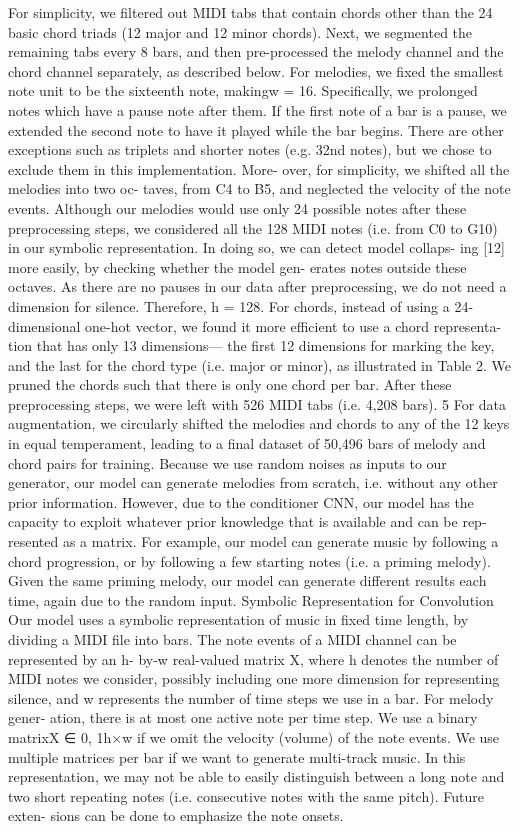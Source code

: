 For simplicity, we filtered out MIDI tabs that contain chords other than the 24 basic chord triads (12 major and 12 minor chords). Next, we segmented the remaining tabs every 8 bars, and then pre-processed the melody channel and the chord channel separately, as described below. For melodies, we fixed the smallest note unit to be the sixteenth note, makingw = 16. Specifically, we prolonged notes which have a pause note after them. If the first note of a bar is a pause, we extended the second note to have it played while the bar begins. There are other exceptions such as triplets and shorter notes (e.g. 32nd notes), but we chose to exclude them in this implementation. More- over, for simplicity, we shifted all the melodies into two oc- taves, from C4 to B5, and neglected the velocity of the note events. Although our melodies would use only 24 possible notes after these preprocessing steps, we considered all the 128 MIDI notes (i.e. from C0 to G10) in our symbolic representation. In doing so, we can detect model collaps- ing [12] more easily, by checking whether the model gen- erates notes outside these octaves. As there are no pauses in our data after preprocessing, we do not need a dimension for silence. Therefore, h = 128. For chords, instead of using a 24-dimensional one-hot vector, we found it more efficient to use a chord representa- tion that has only 13 dimensions— the first 12 dimensions for marking the key, and the last for the chord type (i.e. major or minor), as illustrated in Table 2. We pruned the chords such that there is only one chord per bar. After these preprocessing steps, we were left with 526 MIDI tabs (i.e. 4,208 bars). 5 For data augmentation, we circularly shifted the melodies and chords to any of the 12 keys in equal temperament, leading to a final dataset of 50,496 bars of melody and chord pairs for training.
Because we use random noises as inputs to our generator, our model can generate melodies from scratch, i.e. without any other prior information. However, due to the conditioner CNN, our model has the capacity to exploit whatever prior knowledge that is available and can be rep- resented as a matrix. For example, our model can generate music by following a chord progression, or by following a few starting notes (i.e. a priming melody). Given the same priming melody, our model can generate different results each time, again due to the random input.
Symbolic Representation for Convolution
Our model uses a symbolic representation of music in fixed time length, by dividing a MIDI file into bars. The note events of a MIDI channel can be represented by an h- by-w real-valued matrix X, where h denotes the number of MIDI notes we consider, possibly including one more dimension for representing silence, and w represents the number of time steps we use in a bar. For melody gener- ation, there is at most one active note per time step. We use a binary matrixX ∈ {0, 1}h×w if we omit the velocity (volume) of the note events. We use multiple matrices per bar if we want to generate multi-track music. In this representation, we may not be able to easily distinguish between a long note and two short repeating notes (i.e. consecutive notes with the same pitch). Future exten- sions can be done to emphasize the note onsets.
